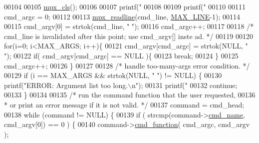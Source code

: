 \begin{DoxyCode}
00104 
00105                 \hyperlink{mpx__util_8c_a8cf3281978ba1652fd5d643e1a41f70b}{mpx_cls}();
00106 
00107                 printf(\textcolor{stringliteral}{"%
00108 
00109                 printf(\textcolor{stringliteral}{"%
00110 
00111                 cmd\_argc = 0;
00112 
00113                 \hyperlink{mpx__util_8c_a781169ab05ad54c0d37253d73060b77f}{mpx_readline}(cmd\_line, \hyperlink{mpx__cmd_8h_a842ed03f27719bc87666bfd1f75415b8}{MAX_LINE}-1);     
00114 
00115                 cmd\_argv[0] = strtok(cmd\_line, \textcolor{stringliteral}{" "}); 
00116                 cmd\_argc++;
00117 
00118                 \textcolor{comment}{/* cmd\_line is invalidated after this point; use cmd\_argv[] inste
      ad. */}
00119 
00120                 \textcolor{keywordflow}{for}(i=0; i<MAX\_ARGS; i++)\{ 
00121                         cmd\_argv[cmd\_argc] = strtok(NULL, \textcolor{stringliteral}{" "});
00122                         \textcolor{keywordflow}{if}( cmd\_argv[cmd\_argc] == NULL )\{
00123                                 \textcolor{keywordflow}{break};
00124                         \}
00125                         cmd\_argc++;
00126                 \}
00127 
00128                 \textcolor{comment}{/* handle too-many-args error condition. */}
00129                 \textcolor{keywordflow}{if} (i == MAX\_ARGS && strtok(NULL, \textcolor{stringliteral}{" "}) != NULL) \{
00130                         printf(\textcolor{stringliteral}{"ERROR: Argument list too long.\(\backslash\)n"});
00131                         printf(\textcolor{stringliteral}{"%
00132                         \textcolor{keywordflow}{continue};
00133                 \}
00134 
00135                 \textcolor{comment}{/* run the command function that the user requested,}
00136 \textcolor{comment}{                 * or print an error message if it is not valid. */}
00137                 command = cmd\_head;
00138                 \textcolor{keywordflow}{while} (command != NULL) \{ 
00139                         \textcolor{keywordflow}{if} ( strcmp(command->\hyperlink{structmpx__cmd_aeae73296151ffcec319820f4d8399e51}{cmd_name}, cmd\_argv[0]) == 0 ) \{
00140                                 command->\hyperlink{structmpx__cmd_ad35d459cc43aac3f75fb308e07572253}{cmd_function}( cmd\_argc, cmd\_argv );
}}}
\end{DoxyCode}
